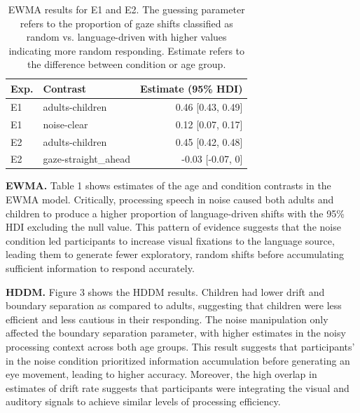 \documentclass[10pt, letterpaper]{article}
\begin{document}
\begin{table}[b]
\centering
\begin{tabular}{llr}
  \hline
Exp. & Contrast & Estimate (95\% HDI) \\ 
  \hline
E1 & adults-children & 0.46 [0.43, 0.49] \\ 
  E1 & noise-clear & 0.12 [0.07, 0.17] \\ 
   \hline
E2 & adults-children & 0.45 [0.42, 0.48] \\ 
  E2 & gaze-straight\_ahead & -0.03 [-0.07, 0] \\ 
   \hline
\end{tabular}
\caption{EWMA results for E1 and E2. The guessing parameter refers to the proportion of gaze shifts classified as random vs. language-driven with higher values indicating more random responding. Estimate refers to the difference between condition or age group.} 
\end{table}

\textbf{EWMA.} Table 1 shows estimates of the age and condition
contrasts in the EWMA model. Critically, processing speech in noise
caused both adults and children to produce a higher proportion of
language-driven shifts with the 95\% HDI excluding the null value. This
pattern of evidence suggests that the noise condition led participants
to increase visual fixations to the language source, leading them to
generate fewer exploratory, random shifts before accumulating sufficient
information to respond accurately.

\textbf{HDDM.} Figure 3 shows the HDDM results. Children had lower drift
and boundary separation as compared to adults, suggesting that children
were less efficient and less cautious in their responding. The noise
manipulation only affected the boundary separation parameter, with
higher estimates in the noisy processing context across both age groups.
This result suggests that participants' in the noise condition
prioritized information accumulation before generating an eye movement,
leading to higher accuracy. Moreover, the high overlap in estimates of
drift rate suggests that participants were integrating the visual and
auditory signals to achieve similar levels of processing efficiency.
\end{document}
